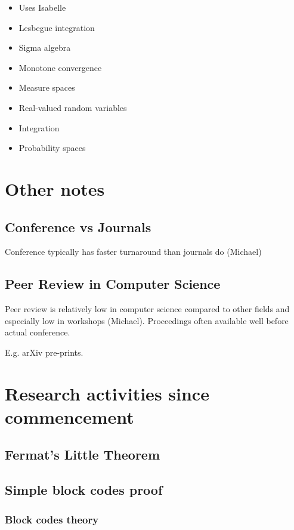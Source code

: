 \documentclass{article}
\begin{document}
\begin{itemize}
\item {Uses Isabelle}
\item {Lesbegue integration}
\item {Sigma algebra}
\item {Monotone convergence}
\item {Measure spaces}
\item {Real-valued random variables}
\item {Integration}
\item{Probability spaces}
\end{itemize}

\section{Other notes}

\subsection{Conference vs Journals}

Conference typically has faster turnaround than journals do (Michael)

\subsection{Peer Review in Computer Science}

Peer review is relatively low in computer science compared to other fields and especially low in workshops (Michael). Proceedings often available well before actual conference.

E.g. arXiv pre-prints.

\section{Research activities since commencement}

\subsection {Fermat's Little Theorem}

\subsection {Simple block codes proof}

\subsubsection {Block codes theory}
\end{document}
